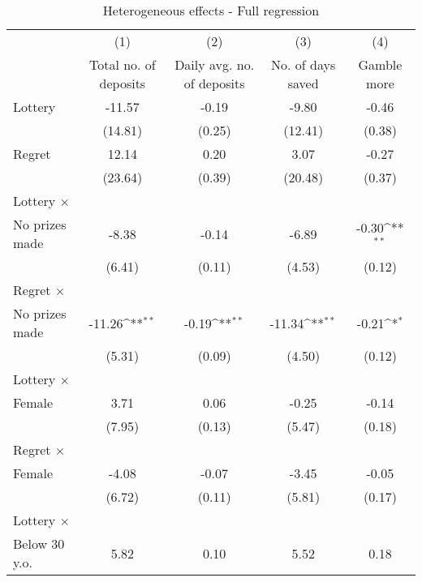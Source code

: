\begin{table}[htbp]\centering
\def\sym#1{\ifmmode^{#1}\else\(^{#1}\)\fi}
\caption{Heterogeneous effects - Full regression}
\begin{tabular}{l*{4}{c}}
\toprule
                &\multicolumn{1}{c}{(1)}&\multicolumn{1}{c}{(2)}&\multicolumn{1}{c}{(3)}&\multicolumn{1}{c}{(4)}\\
                &\multicolumn{1}{c}{Total no. of deposits}&\multicolumn{1}{c}{Daily avg. no. of deposits}&\multicolumn{1}{c}{No. of days saved}&\multicolumn{1}{c}{Gamble more}\\
\midrule
Lottery         &   -11.57         &    -0.19         &    -9.80         &    -0.46         \\
                &  (14.81)         &   (0.25)         &  (12.41)         &   (0.38)         \\
\addlinespace
Regret          &    12.14         &     0.20         &     3.07         &    -0.27         \\
                &  (23.64)         &   (0.39)         &  (20.48)         &   (0.37)         \\
\addlinespace
Lottery $\times$ \\ No prizes made&    -8.38         &    -0.14         &    -6.89         &    -0.30\sym{**} \\
                &   (6.41)         &   (0.11)         &   (4.53)         &   (0.12)         \\
\addlinespace
Regret $\times$ \\ No prizes made&   -11.26\sym{**} &    -0.19\sym{**} &   -11.34\sym{**} &    -0.21\sym{*}  \\
                &   (5.31)         &   (0.09)         &   (4.50)         &   (0.12)         \\
\addlinespace
Lottery $\times$ \\ Female&     3.71         &     0.06         &    -0.25         &    -0.14         \\
                &   (7.95)         &   (0.13)         &   (5.47)         &   (0.18)         \\
\addlinespace
Regret $\times$ \\ Female&    -4.08         &    -0.07         &    -3.45         &    -0.05         \\
                &   (6.72)         &   (0.11)         &   (5.81)         &   (0.17)         \\
\addlinespace
Lottery $\times$ \\ Below 30 y.o.&     5.82         &     0.10         &     5.52         &     0.18         \\

\end{tabular}
\end{table}

